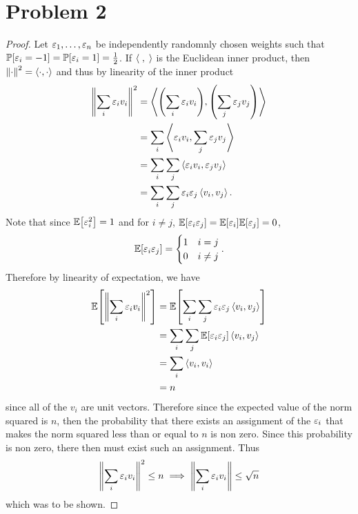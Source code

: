 \documentclass{eeleyes}
\begin{document}
\section*{Problem 2}

\begin{proof}
    Let $\varepsilon_1, \ldots, \varepsilon_n$ be independently randomnly chosen weights such that $\mathbb{P}\qty[\varepsilon_i = -1] = \mathbb{P}\qty[\varepsilon_i = 1] = \frac{1}{2}$. If $\left\langle \;, \; \right\rangle$ is the Euclidean inner product, then $\norm{\cdot}^2 = \left\langle \cdot, \cdot \right\rangle$ and thus by linearity of the inner product
    \begin{align*}
        \norm{\sum_{i} \varepsilon_i v_i}^2 &= \left\langle \qty(\sum_{i} \varepsilon_i v_i), \qty(\sum_{j} \varepsilon_j v_j) \right\rangle \\
                             &= \sum_{i} \left\langle \varepsilon_i v_i, \sum_{j} \varepsilon_j v_j \right\rangle \\
                             &= \sum_{i} \sum_j \left\langle \varepsilon_i v_i, \varepsilon_j v_j \right\rangle \\
                             &= \sum_{i} \sum_j \varepsilon_i \varepsilon_j  \left\langle v_i, v_j \right\rangle
    .\end{align*}
    Note that since $\mathbb{E}\qty[\varepsilon_i^2] = 1$ and for $i \neq j$, $\mathbb{E}\qty[\varepsilon_i \varepsilon_j] = \mathbb{E}\qty[\varepsilon_i] \mathbb{E}\qty[\varepsilon_j] = 0$,
    \[
        \mathbb{E}\qty[\varepsilon_i \varepsilon_j] = \begin{cases}
            1 & i = j \\
            0 & i \neq j
        \end{cases}
    .\]
    Therefore by linearity of expectation, we have
    \begin{align*}
        \mathbb{E}\qty[\norm{\sum_i \varepsilon_i v_i}^2] &= \mathbb{E}\qty[\sum_{i} \sum_j \varepsilon_i \varepsilon_j  \left\langle v_i, v_j \right\rangle] \\
        &= \sum_i \sum_j \mathbb{E}\qty[\varepsilon_i \varepsilon_j] \left\langle v_i, v_j \right\rangle \\
        &= \sum_i \left\langle v_i, v_i \right\rangle \\
        &= n
    \end{align*}
    since all of the $v_i$ are unit vectors. Therefore since the expected value of the norm squared is $n$, then the probability that there exists an assignment of the $\varepsilon_i$ that makes the norm squared less than or equal to $n$ is non zero. Since this probability is non zero, there then must exist such an assignment. Thus
    \[
        \norm{\sum_i \varepsilon_i v_i}^2 \leq n \implies \norm{\sum_i \varepsilon_i v_i} \leq \sqrt{n}
    \]
    which was to be shown.
\end{proof}
\end{document}

